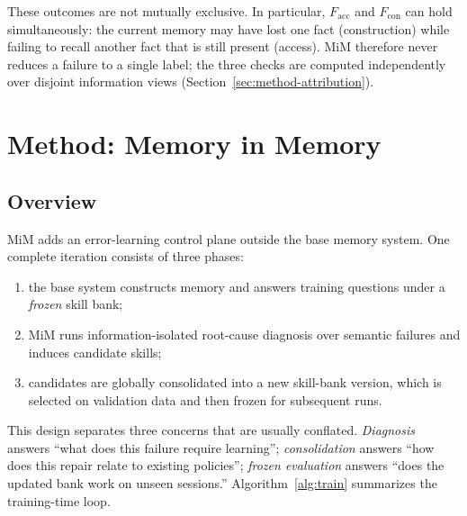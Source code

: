 \documentclass[11pt]{article}
\begin{document}
These outcomes are not mutually exclusive. In particular,
$F_{\mathrm{acc}}$ and $F_{\mathrm{con}}$ can hold simultaneously: the current
memory may have lost one fact (construction) while failing to recall another
fact that is still present (access). MiM therefore never reduces a failure to a
single label; the three checks are computed independently over disjoint
information views (Section~\ref{sec:method-attribution}).

\section{Method: Memory in Memory}
\label{sec:method}

\subsection{Overview}
\label{sec:method-overview}

MiM adds an error-learning control plane outside the base memory system. One
complete iteration consists of three phases:

\begin{enumerate}[leftmargin=*,itemsep=2pt,topsep=4pt]
  \item the base system constructs memory and answers training questions under a
  \emph{frozen} skill bank;
  \item MiM runs information-isolated root-cause diagnosis over semantic
  failures and induces candidate skills;
  \item candidates are globally consolidated into a new skill-bank version,
  which is selected on validation data and then frozen for subsequent runs.
\end{enumerate}

This design separates three concerns that are usually conflated. \emph{Diagnosis}
answers ``what does this failure require learning''; \emph{consolidation}
answers ``how does this repair relate to existing policies''; \emph{frozen
evaluation} answers ``does the updated bank work on unseen sessions.''
Algorithm~\ref{alg:train} summarizes the training-time loop.
\end{document}
